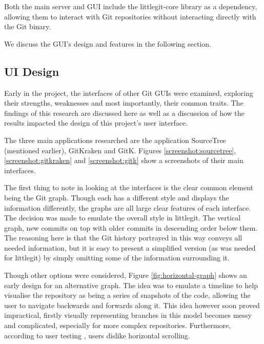 Both the main server and GUI include the littlegit-core library as a dependency, allowing them to interact with Git repositories without interacting directly with the Git binary. 

We discuss the GUI's design and features in the following section.

\subsection{UI Design}
 
Early in the project, the interfaces of other Git GUIs were examined, exploring their strengths, weaknesses and most importantly, their common traits. The findings of this research are discussed here as well as a discussion of how the results impacted the design of this project's user interface.

The three main applications researched are the application SourceTree \cite{sourcetree} (mentioned earlier), GitKraken\cite{gitkraken} and GitK\cite{gitk}. Figures \ref{screenshot:sourcetree}, \ref{screenshot:gitkraken} and \ref{screenshot:gitk} show a screenshots of their main interfaces.




The first thing to note in looking at the interfaces is the clear common element being the Git graph. Though each has a different style and displays the information differently, the graphs are all large clear features of each interface. The decision was made to emulate the overall style in littlegit. The vertical graph, new commits on top with older commits in descending order below them. The reasoning here is that the Git history portrayed in this way conveys all needed information, but it is easy to present a simplified version (as was needed for littlegit) by simply omitting some of the information surrounding it.

Though other options were considered, Figure \ref{fig:horizontal-graph} shows an early design for an alternative graph. The idea was to emulate a timeline to help visualise the repository as being a series of snapshots of the code, allowing the user to navigate backwards and forwards along it. This idea however soon proved impractical, firstly visually representing branches in this model becomes messy and complicated, especially for more complex repositories. Furthermore, according to user testing \cite{horizontalScrolling}, users dislike horizontal scrolling.

